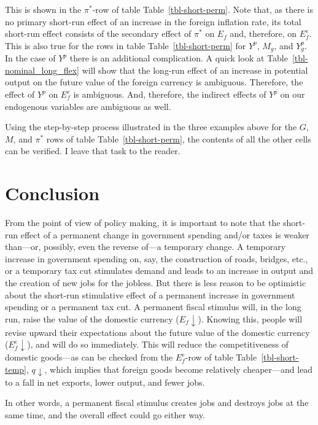 \documentclass[
  letterpaper,
]{book}
\theoremstyle{plain}
\theoremstyle{remark}
\begin{document}
This is shown in the \(\pi^*\)-row of table Table~\ref{tbl-short-perm}.
Note that, as there is no primary short-run effect of an increase in the
foreign inflation rate, its total short-run effect consists of the
secondary effect of \(\pi^*\) on \(E_f\) and, therefore, on \(E_f^e\).
This is also true for the rows in table Table~\ref{tbl-short-perm} for
\(Y^p\), \(M_g\), and \(Y^p_g\). In the case of \(Y^p\) there is an
additional complication. A quick look at
Table~\ref{tbl-nominal_long_flex} will show that the long-run effect of
an increase in potential output on the future value of the foreign
currency is ambiguous. Therefore, the effect of \(Y^p\) on \(E_f^e\) is
ambiguous. And, therefore, the indirect effects of \(Y^p\) on our
endogenous variables are ambiguous as well.

Using the step-by-step process illustrated in the three examples above
for the \(G\), \(M\), and \(\pi^*\) rows of table
Table~\ref{tbl-short-perm}, the contents of all the other cells can be
verified. I leave that task to the reader.

\section{Conclusion}\label{sec-short-perm-conclusion}

From the point of view of policy making, it is important to note that
the short-run effect of a permanent change in government spending and/or
taxes is weaker than---or, possibly, even the reverse of---a temporary
change. A temporary increase in government spending on, say, the
construction of roads, bridges, etc., or a temporary tax cut stimulates
demand and leads to an increase in output and the creation of new jobs
for the jobless. But there is less reason to be optimistic about the
short-run stimulative effect of a permanent increase in government
spending or a permanent tax cut. A permanent fiscal stimulus will, in
the long run, raise the value of the domestic currency
(\(E_f\downarrow\)). Knowing this, people will revise upward their
expectations about the future value of the domestic currency
(\(E_f^e\downarrow\)), and will do so immediately. This will reduce the
competitiveness of domestic goods---as can be checked from the
\(E_f^e\)-row of table Table~\ref{tbl-short-temp}, \(q\downarrow\),
which implies that foreign goods become relatively cheaper---and lead to
a fall in net exports, lower output, and fewer jobs.

In other words, a permanent fiscal stimulus creates jobs and destroys
jobs at the same time, and the overall effect could go either way.
\end{document}
